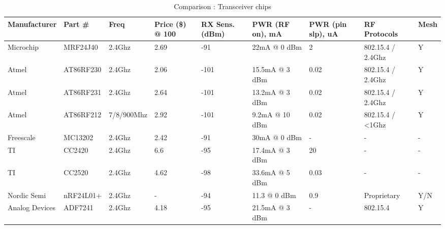 \begin{landscape}
   \begin{table}[h]
     \centering
     \begin{tabularx}{2\textwidth}{l l l p{1.5cm} p{1.5cm} l p{2.5cm} l l}
        Manufacturer   & Part \#   & Freq       & Price (\$) @ 100 & RX Sens. (dBm) & PWR (RF on), mA & PWR (pin slp), uA & RF Protocols      & Mesh \\ \hline
        Microchip      & MRF24J40  & 2.4Ghz     & 2.69            & -91            & 22mA @ 0 dBm      & 2                 & 802.15.4 / 2.4Ghz & Y    \\ 
        Atmel          & AT86RF230 & 2.4Ghz     & 2.06            & -101           & 15.5mA @ 3 dBm    & 0.02              & 802.15.4 / 2.4Ghz & Y    \\ 
        Atmel          & AT86RF231 & 2.4Ghz     & 2.64            & -101           & 13.2mA @ 3 dBm    & 0.02              & 802.15.4 / 2.4Ghz & Y    \\ 
        Atmel          & AT86RF212 & 7/8/900Mhz & 2.92            & -101           & 9.2mA @ 10 dBm    & 0.02              & 802.15.4 / <1Ghz  & Y    \\ 
        Freescale      & MC13202   & 2.4Ghz     & 2.42            & -91            & 30mA @ 0 dBm      & -                 & -                 & -    \\ 
        TI             & CC2420    & 2.4Ghz     & 6.6             & -95            & 17.4mA @ 3 dBm    & 20                & -                 & -    \\ 
        TI             & CC2520    & 2.4Ghz     & 4.62            & -98            & 33.6mA @ 5 dBm    & 0.03              & -                 & -    \\ 
        Nordic Semi    & nRF24L01+ & 2.4Ghz     & -               & -94            & 11.3 @ 0 dBm      & 0.9               & Proprietary       & Y/N  \\ 
        Analog Devices & ADF7241   & 2.4Ghz     & 4.18            & -95            & 21.5mA @ 3 dBm    & -                 & 802.15.4          & Y    \\ 
     \end{tabularx}
     \caption{Comparison : Transceiver chips}
     \label{tab:transceiver-comparison}
   \end{table}
 \end{landscape}


